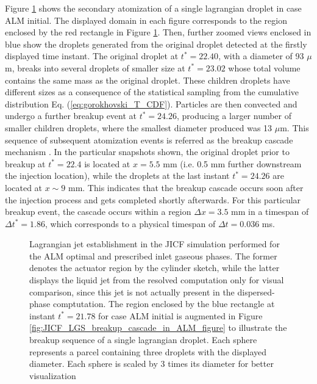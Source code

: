 Figure \ref{fig:JICF_LGS_spray_establishment} shows the secondary atomization of a single lagrangian droplet in case ALM initial. The displayed domain in each figure corresponds to the region enclosed by the red rectangle in Figure \ref{fig:JICF_LGS_spray_establishment}. Then, further zoomed views enclosed in blue show the droplets generated from the original droplet detected at the firstly displayed time instant. The original droplet at $t^* = 22.40$, with a diameter of 93 $\mu$m, breaks into several droplets of smaller size at $t^* = 23.02$ whose total volume contains the same mass as the original droplet. These children droplets have different sizes as a consequence of the statistical sampling from the cumulative distribution Eq. (\ref{eq:gorokhovski_T_CDF}). Particles are then convected and undergo a further breakup event at $t^* = 24.26$, producing a larger number of smaller children droplets, where the smallest diameter produced was 13 $\mu$m. This sequence of subsequent atomization events is referred as the breakup cascade mechanism . In the particular snapshots shown, the original droplet prior to breakup at $t^* = 22.4$ is located at $x = 5.5$ mm (i.e. 0.5 mm further downstream the injection location), while the droplets at the last instant $t^* = 24.26$ are located at $x \sim 9$ mm. This indicates that the breakup cascade occurs soon after the injection process and gets completed shortly afterwards. For this particular breakup event, the cascade occurs within a region $\Delta x = 3.5$ mm in a timespan of $\Delta t^* = 1.86$, which corresponds to a physical timespan of $\Delta t = 0.036$ ms. 

\clearpage


\begin{figure}[h!]
	\centering	{}
	\caption[Lagrangian jet establishment in the JICF simulation performed for the ALM optimal and prescribed inlet gaseous phases]{Lagrangian jet establishment in the JICF simulation performed for the ALM optimal and prescribed inlet gaseous phases. The former denotes the actuator region by the cylinder sketch, while the latter displays the liquid jet from the resolved computation only for visual comparison, since this jet is not actually present in the dispersed-phase comptutation. The region enclosed by the blue rectangle at instant $t^* = 21.78$ for case ALM initial is augmented in Figure \ref{fig:JICF_LGS_breakup_cascade_in_ALM_figure} to illustrate the breakup sequence of a single lagrangian droplet. Each sphere represents a parcel containing three droplets with the displayed diameter. Each sphere is scaled by 3 times its diameter for better visualization}
	\label{fig:JICF_LGS_spray_establishment}
\end{figure}


